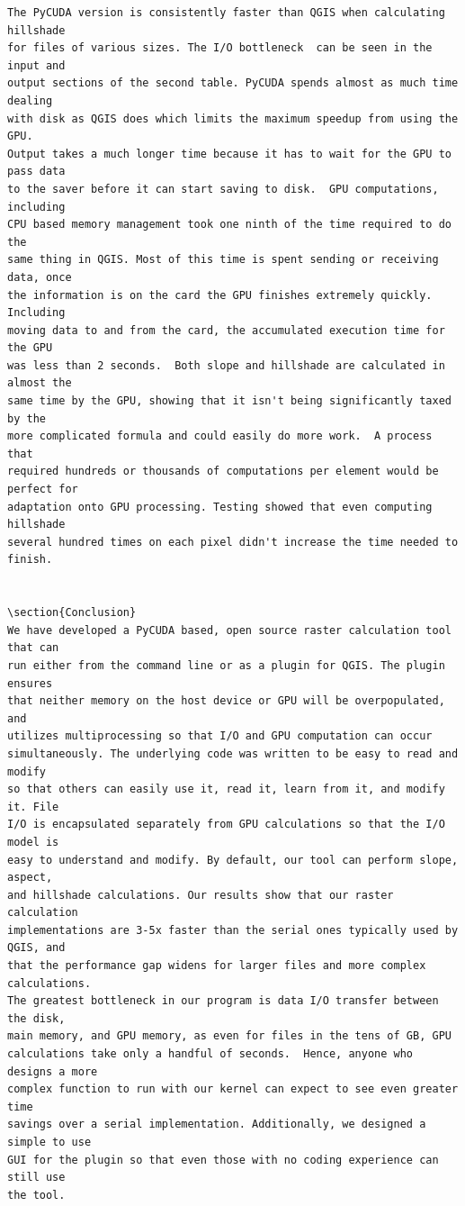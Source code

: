 \documentclass[journal]{IEEEtran}
\begin{document}
\begin{Verbatim}[frame=single]
The PyCUDA version is consistently faster than QGIS when calculating hillshade
for files of various sizes. The I/O bottleneck  can be seen in the input and
output sections of the second table. PyCUDA spends almost as much time dealing
with disk as QGIS does which limits the maximum speedup from using the GPU.
Output takes a much longer time because it has to wait for the GPU to pass data
to the saver before it can start saving to disk.  GPU computations, including
CPU based memory management took one ninth of the time required to do the
same thing in QGIS. Most of this time is spent sending or receiving data, once
the information is on the card the GPU finishes extremely quickly. Including
moving data to and from the card, the accumulated execution time for the GPU
was less than 2 seconds.  Both slope and hillshade are calculated in almost the
same time by the GPU, showing that it isn't being significantly taxed by the
more complicated formula and could easily do more work.  A process that
required hundreds or thousands of computations per element would be perfect for
adaptation onto GPU processing. Testing showed that even computing hillshade
several hundred times on each pixel didn't increase the time needed to finish.


\section{Conclusion}
We have developed a PyCUDA based, open source raster calculation tool that can
run either from the command line or as a plugin for QGIS. The plugin ensures
that neither memory on the host device or GPU will be overpopulated, and
utilizes multiprocessing so that I/O and GPU computation can occur
simultaneously. The underlying code was written to be easy to read and modify
so that others can easily use it, read it, learn from it, and modify it. File
I/O is encapsulated separately from GPU calculations so that the I/O model is
easy to understand and modify. By default, our tool can perform slope, aspect,
and hillshade calculations. Our results show that our raster calculation
implementations are 3-5x faster than the serial ones typically used by QGIS, and
that the performance gap widens for larger files and more complex calculations.
The greatest bottleneck in our program is data I/O transfer between the disk,
main memory, and GPU memory, as even for files in the tens of GB, GPU
calculations take only a handful of seconds.  Hence, anyone who designs a more
complex function to run with our kernel can expect to see even greater time
savings over a serial implementation. Additionally, we designed a simple to use
GUI for the plugin so that even those with no coding experience can still use
the tool.


\end{Verbatim}
\end{document}
